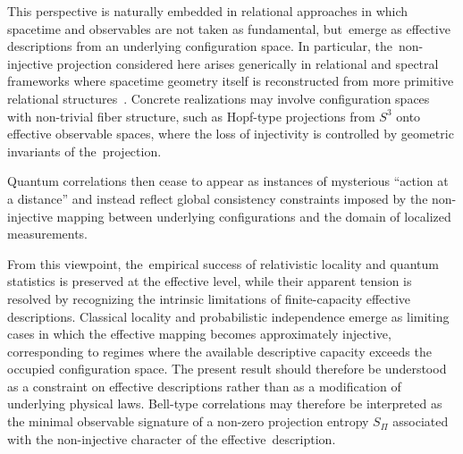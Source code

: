 \documentclass[quantumrep,article,accept,pdftex,oneauthor]{Definitions/mdpi}
\theoremstyle{remark}
\begin{document}
  This perspective is naturally embedded in relational approaches in which spacetime
  and observables are not taken as fundamental, but~emerge as effective descriptions
  from an underlying configuration space.
  In particular, the~non-injective projection considered here arises generically in
  relational and spectral frameworks where spacetime geometry itself is reconstructed
  from more primitive relational structures~\cite{Beau2026a}.
  Concrete realizations may involve configuration spaces with non-trivial fiber
  structure, such as Hopf-type projections from $S^3$ onto effective observable
  spaces, where the loss of injectivity is controlled by geometric invariants of
  the~projection.

  Quantum correlations then cease to appear as instances of mysterious ``action at a
  distance'' and instead reflect global consistency constraints imposed by the
  non-injective mapping between underlying configurations and the domain of localized
  measurements.

  From this viewpoint, the~empirical success of relativistic locality and quantum
  statistics is preserved at the effective level, while their apparent tension is resolved
  by recognizing the intrinsic limitations of finite-capacity effective descriptions.
  Classical locality and probabilistic independence emerge as limiting cases in which
  the effective mapping becomes approximately injective, corresponding to regimes where
  the available descriptive capacity exceeds the occupied configuration space.
  The present result should therefore be understood as a constraint on effective
  descriptions rather than as a modification of underlying physical laws.
  Bell-type correlations may therefore be interpreted as the minimal observable
  signature of a non-zero projection entropy $S_{\Pi}$ associated with the
  non-injective character of the effective~description.
\vspace{6pt}



\end{document}

